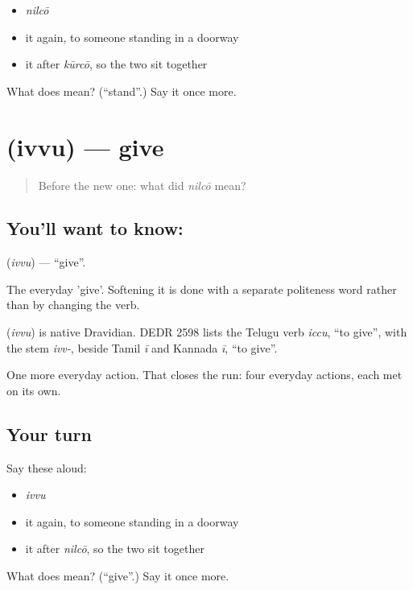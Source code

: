 \begin{itemize}
\raggedright
  \item \emph{nilcō}
  \item it again, to someone standing in a doorway
  \item it after \emph{kūrcō}, so the two sit together
\end{itemize}

\begin{tcolorbox}[breakable,colback=teal!4,colframe=teal!35!black,title={Before you move on}]
What does  mean? (\textquotedblleft{}stand\textquotedblright{}.) Say it once more.
\end{tcolorbox}
\section[\texorpdfstring{\te{ఇవ్వు} (ivvu)}{ఇవ్వు (ivvu)}]{ (ivvu) — give}

\label{lesson:TE-C43-give}



\begin{quote}
Before the new one: what did \emph{nilcō} mean?
\end{quote}

\subsection*{You'll want to know: }
\textbf{} (\emph{ivvu}) — \textquotedblleft{}give\textquotedblright{}.

The everyday 'give'. Softening it is done with a separate politeness word rather than by changing the verb.

\begin{cousinweb}
\textbf{} (\emph{ivvu}) is native Dravidian. DEDR 2598 lists the Telugu verb \emph{iccu}, \textquotedblleft{}to give\textquotedblright{}, with the stem \emph{ivv-}, beside Tamil \emph{ī} and Kannada \emph{ī}, \textquotedblleft{}to give\textquotedblright{}.
\end{cousinweb}

\begin{grammarlens}[title={What you've built}]
One more everyday action. That closes the run: four everyday actions, each met on its own.
\end{grammarlens}

\subsection*{Your turn}
Say these aloud:

\begin{itemize}
\raggedright
  \item \emph{ivvu}
  \item it again, to someone standing in a doorway
  \item it after \emph{nilcō}, so the two sit together
\end{itemize}

\begin{tcolorbox}[breakable,colback=teal!4,colframe=teal!35!black,title={Before you move on}]
What does  mean? (\textquotedblleft{}give\textquotedblright{}.) Say it once more.
\end{tcolorbox}
